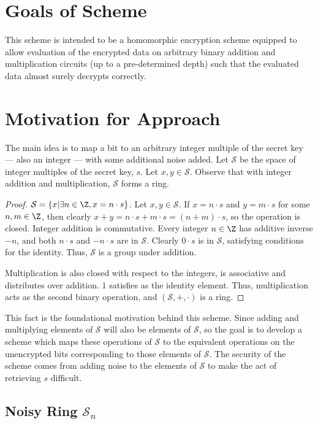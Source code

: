 \documentclass[a4paper,11pt, oneside]{article}
\newcommand{\ring}{\mathcal{S}}
\newcommand{\nring}{\mathcal{S}_n}
\begin{document}
\section{Goals of Scheme}
This scheme is intended to be a homomorphic encryption scheme equipped to allow evaluation of the encrypted data on arbitrary binary addition and multiplication circuits (up to a pre-determined depth) such that the evaluated data almost surely decrypts correctly.  

\section{Motivation for Approach}
The main idea is to map a bit to an arbitrary integer multiple of the secret key --- also an integer --- with some additional noise added.  Let $\ring$ be the space of integer multiples of the secret key, $s$.  Let $x,y\in \ring$.  Observe that with integer addition and multiplication, $\ring$ forms a ring.

\begin{proof}
  $\ring = \left\{ x | \exists n\in \Z, x = n\cdot s\right\}$.  Let $x,y\in \ring$. If $x = n\cdot s$ and $y = m\cdot s$ for some $n,m\in\Z$, then clearly $x+y = n\cdot s + m\cdot s = (n+m)\cdot s$, so the operation is closed.  Integer addition is commutative.  Every integer $n\in \Z$ has additive inverse $-n$, and both $n\cdot s$ and $-n\cdot s$ are in $\ring$.  Clearly $0\cdot s$ is in $\ring$, satisfying conditions for the identity.  Thus, $\ring$ is a group under addition.  
  
  Multiplication is also closed with respect to the integers, is associative and distributes over addition.  $1$ satisfies as the identity element.  Thus, multiplication acts as the second binary operation, and $(\ring, +, \cdot)$ is a ring.
\end{proof}

This fact is the foundational motivation behind this scheme.  Since adding and multiplying elements of $\ring$ will also be elements of $\ring$, so the goal is to develop a scheme which maps these operations of $\ring$ to the equivalent operations on the unencrypted bits corresponding to those elements of $\ring$.  The security of the scheme comes from adding noise to the elements of $\ring$ to make the act of retrieving $s$ difficult.

\subsection{Noisy Ring $\nring$}
\end{document}
